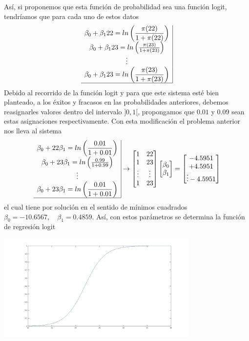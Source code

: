 \documentclass[letterpaper,11pt]{article}
\begin{document}
As\'i, si proponemos que esta funci\'on de probabilidad sea una funci\'on logit, tendr\'iamos que para cada uno de estos datos
$$
\begin{array}{c|}
\displaystyle
\beta_0+\beta_1 22 = ln\left(\frac{\pi(22)}{1+\pi(22)}\right)
\displaystyle\\
\beta_0+\beta_1 23 = ln\left(\frac{\pi(23)}{1+\pi(23)}\right) \\
\vdots\\
\displaystyle
\beta_0+\beta_1 23 = ln\left(\frac{\pi(23)}{1+\pi(23)}\right)\\
\hline
\end{array}
$$
Debido al recorrido de la funci\'on logit y para que este sistema est\'e bien planteado, a los \'exitos y fracasos en las probabilidades anteriores, debemos reasignarles valores dentro del intervalo $]0,1[$, propongamos que $0.01$ y $0.09$ sean estas asignaciones respectivamente. Con esta modificaci\'on el problema anterior nos lleva al sistema
$$
\begin{array}{c|}
\displaystyle
\beta_0+22\beta_1  = ln\left(\frac{0.01}{1+0.01}\right)
\displaystyle\\
\beta_0+ 23\beta_1 = ln\left(\frac{0.99}{1+0.99}\right) \\
\vdots\\
\displaystyle
\beta_0+23\beta_1  = ln\left(\frac{0.01}{1+0.01}\right)\\
\hline
\end{array}
\rightarrow
\begin{bmatrix}
1 & 22\\
1 & 23 \\
\vdots & \vdots\\
1 & 23
\end{bmatrix}
\begin{bmatrix}
\beta_0\\\beta_1
\end{bmatrix}
=
\begin{bmatrix}
-4.5951\\
+4.5951\\
\vdots
-4.5951\\
\end{bmatrix}
$$
el cual tiene por soluci\'on en el sentido de m\'inimos cuadrados
$
\beta_0=-10.6567, \quad \beta_1=0.4859.
$
As\'i, con estos par\'ametros se determina la funci\'on de regresi\'on logit
\begin{center}
\includegraphics[width=0.75\textwidth]{./logitejemplo.jpg}\\
\end{center}
\end{document}

